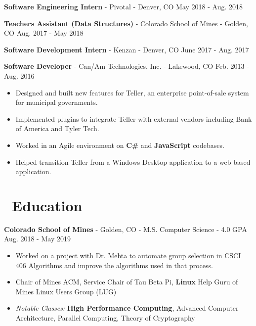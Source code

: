 \documentclass[10pt,letterpaper]{article}
\begin{document}
\textbf{Software Engineering Intern} - Pivotal - Denver, CO
\hfill May 2018 - Aug. 2018

\vspace{2pt}
\textbf{Teachers Assistant (Data Structures)} - Colorado School of Mines -
Golden, CO \hfill Aug. 2017 - May 2018

\vspace{2pt}
\textbf{Software Development Intern} - Kenzan - Denver, CO
\hfill June 2017 - Aug. 2017

\vspace{2pt}
\textbf{Software Developer} - Can/Am Technologies, Inc. - Lakewood, CO
\hfill Feb. 2013 - Aug. 2016
\begin{itemize}
    \item Designed and built new features for Teller, an enterprise
        point-of-sale system for municipal governments.
    \item Implemented plugins to integrate Teller with external vendors
        including Bank of America and Tyler Tech.
    \item Worked in an Agile environment on \textbf{C\#} and \textbf{JavaScript}
        codebases.
    \item Helped transition Teller from a Windows Desktop application to a
        web-based application.
\end{itemize}

\section*{\faBook\ Education}
\textbf{Colorado School of Mines} - Golden, CO - M.S. Computer Science - 4.0 GPA
\hfill Aug. 2018 - May 2019
\begin{itemize}
    \item Worked on a project with Dr. Mehta to automate group selection in
        CSCI 406 Algorithms and improve the algorithms used in that process.
    \item Chair of Mines ACM, Service Chair of Tau Beta Pi, \textbf{Linux} Help
        Guru of Mines Linux Users Group (LUG)
    \item \textit{Notable Classes:} \textbf{High Performance Computing},
        Advanced Computer Architecture, Parallel Computing, Theory of
        Cryptography
\end{itemize}
\end{document}
